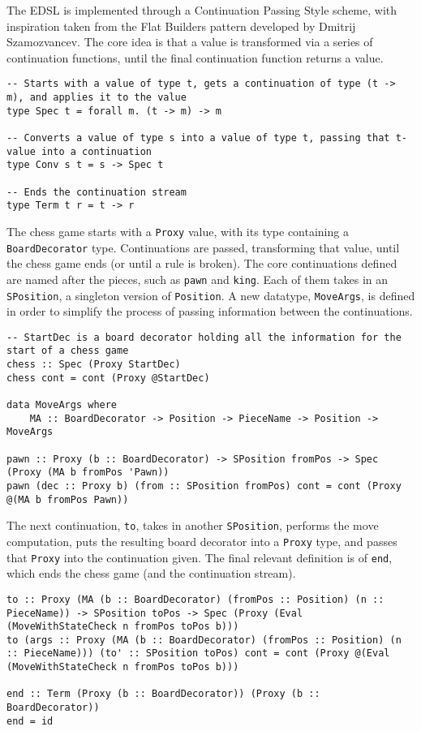 \documentclass[12pt, a4paper]{scrartcl}
\begin{document}
The EDSL is implemented through a Continuation Passing Style\cite{cps} scheme, with inspiration taken from the Flat Builders pattern developed by Dmitrij Szamozvancev\cite{mezzo}. The core idea is that a value is transformed via a series of continuation functions, until the final continuation function returns a value.

\begin{lstlisting}
-- Starts with a value of type t, gets a continuation of type (t -> m), and applies it to the value
type Spec t = forall m. (t -> m) -> m

-- Converts a value of type s into a value of type t, passing that t-value into a continuation
type Conv s t = s -> Spec t

-- Ends the continuation stream
type Term t r = t -> r
\end{lstlisting}

The chess game starts with a \lstinline{Proxy} value, with its type containing a \lstinline{BoardDecorator} type. Continuations are passed, transforming that value, until the chess game ends (or until a rule is broken). The core continuations defined are named after the pieces, such as \lstinline{pawn} and \lstinline{king}. Each of them takes in an \lstinline{SPosition}, a singleton version of \lstinline{Position}. A new datatype, \lstinline{MoveArgs}, is defined in order to simplify the process of passing information between the continuations.

\begin{lstlisting}
-- StartDec is a board decorator holding all the information for the start of a chess game
chess :: Spec (Proxy StartDec)
chess cont = cont (Proxy @StartDec)

data MoveArgs where
    MA :: BoardDecorator -> Position -> PieceName -> Position -> MoveArgs

pawn :: Proxy (b :: BoardDecorator) -> SPosition fromPos -> Spec (Proxy (MA b fromPos 'Pawn))
pawn (dec :: Proxy b) (from :: SPosition fromPos) cont = cont (Proxy @(MA b fromPos Pawn))
\end{lstlisting}

The next continuation, \lstinline{to}, takes in another \lstinline{SPosition}, performs the move computation, puts the resulting board decorator into a \lstinline{Proxy} type, and passes that \lstinline{Proxy} into the continuation given. The final relevant definition is of \lstinline{end}, which ends the chess game (and the continuation stream).

\begin{lstlisting}
to :: Proxy (MA (b :: BoardDecorator) (fromPos :: Position) (n :: PieceName)) -> SPosition toPos -> Spec (Proxy (Eval (MoveWithStateCheck n fromPos toPos b)))
to (args :: Proxy (MA (b :: BoardDecorator) (fromPos :: Position) (n :: PieceName))) (to' :: SPosition toPos) cont = cont (Proxy @(Eval (MoveWithStateCheck n fromPos toPos b)))

end :: Term (Proxy (b :: BoardDecorator)) (Proxy (b :: BoardDecorator))
end = id
\end{lstlisting}
\end{document}
